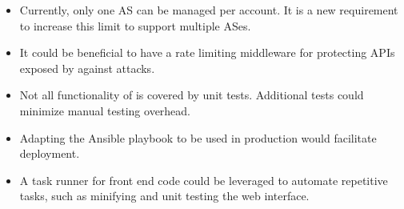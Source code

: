 \begin{itemize}
	\item Currently, only one AS can be managed per account. It is a new requirement to increase this limit to support multiple ASes.
	\item It could be beneficial to have a rate limiting middleware for protecting APIs exposed by \lcs against  attacks.
	\item Not all functionality of \lcs is covered by unit tests. Additional tests could minimize manual testing overhead.
	\item Adapting the Ansible playbook to be used in production would facilitate deployment.
	\item A task runner for front end code could be leveraged to automate repetitive tasks, such as minifying and unit testing the web interface.
\end{itemize}



 
